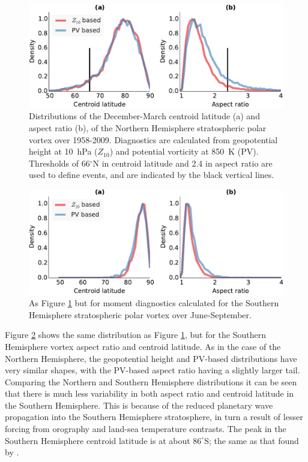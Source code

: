 \begin{figure}
  \centering
  \includegraphics[width=\textwidth]{figures/chapter-moments/moments_distribution_crop.pdf}
  \caption[NH distributions of $Z_{10}$ and PV-based moment
  diagnostics.]{Distributions of the December-March centroid latitude (a) and
    aspect ratio (b), of the Northern Hemisphere stratospheric polar vortex over
    1958-2009. Diagnostics are calculated from geopotential height at 10~hPa
    ($Z_{10}$) and potential vorticity at 850~K (PV). Thresholds of
    66$^{\circ}$N in centroid latitude and 2.4 in aspect ratio are used to
    define events, and are indicated by the black vertical lines.}
  \label{fig:pv_z_moments_distribution}
\end{figure}

\begin{figure}
  \centering
  \includegraphics[width=\textwidth]{figures/chapter-moments/moments_distribution_crop_sh.pdf}
  \caption[SH distributions of $Z_{10}$ and PV-based moment diagnostics.]{As
    Figure \ref{fig:pv_z_moments_distribution} but for moment diagnostics
    calculated for the Southern Hemisphere stratospheric polar vortex over
    June-September.}
  \label{fig:pv_z_moments_distribution_sh}
\end{figure}

Figure \ref{fig:pv_z_moments_distribution_sh} shows the same distribution as
Figure \ref{fig:pv_z_moments_distribution}, but for the Southern Hemisphere
vortex aspect ratio and centroid latitude. As in the case of the Northern
Hemisphere, the geopotential height and PV-based distributions have very similar
shapes, with the PV-based aspect ratio having a slightly larger tail. Comparing
the Northern and Southern Hemisphere distributions it can be seen that there is
much less variability in both aspect ratio and centroid latitude in the Southern
Hemisphere. This is because of the reduced planetary wave propagation into the
Southern Hemisphere stratosphere, in turn a result of lesser forcing from
orography and land-sea temperature contrasts. The peak in the Southern
Hemisphere centroid latitude is at about $86^{\circ}$S; the same as that found
by \citet{Waugh1999}. 

